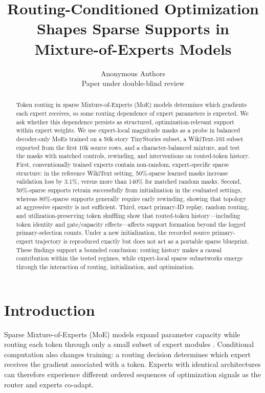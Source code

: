 \documentclass{article}
\title{Routing-Conditioned Optimization Shapes Sparse Supports in
Mixture-of-Experts Models}
\author{Anonymous Authors\\Paper under double-blind review}
\date{}
\begin{document}
\maketitle

\begin{abstract}
Token routing in sparse Mixture-of-Experts (MoE) models determines which
gradients each expert receives, so some routing dependence of expert parameters
is expected. We ask whether this dependence persists as structured,
optimization-relevant support within expert weights. We use expert-local
magnitude masks as a probe in balanced decoder-only MoEs trained on a
50k-story TinyStories subset, a WikiText-103 subset exported from the first
10k source rows, and a
character-balanced mixture, and test the masks with matched controls,
rewinding, and interventions on routed-token history. First, conventionally
trained experts contain non-random, expert-specific sparse structure: in the
reference WikiText setting, 50\%-sparse learned masks increase validation loss
by 3.1\%, versus more than 140\% for matched random masks. Second, 50\%-sparse
supports retrain successfully from initialization in the evaluated settings,
whereas 80\%-sparse supports generally require early rewinding, showing that
topology at aggressive sparsity is not sufficient. Third, exact primary-ID
replay, random routing, and utilization-preserving token shuffling show that routed-token
history---including token identity and gate/capacity effects---affects support
formation beyond the logged primary-selection counts.
Under a new initialization, the recorded source primary-expert trajectory is
reproduced exactly but does not act as a portable sparse blueprint. These
findings support a bounded conclusion:
routing history makes a causal contribution within the tested regimes, while
expert-local sparse subnetworks emerge through the interaction of routing,
initialization, and optimization.
\end{abstract}

\section{Introduction}
\label{sec:introduction}

Sparse Mixture-of-Experts (MoE) models expand parameter capacity while routing
each token through only a small subset of expert modules
\citep{shazeer2017outrageouslylargeneuralnetworks,
lepikhin2020gshardscalinggiantmodels,
fedus2022switchtransformersscalingtrillion}. Conditional computation also
changes training: a routing decision determines which expert receives the
gradient associated with a token. Experts with identical architectures can
therefore experience different ordered sequences of optimization signals as
the router and experts co-adapt.
\end{document}
